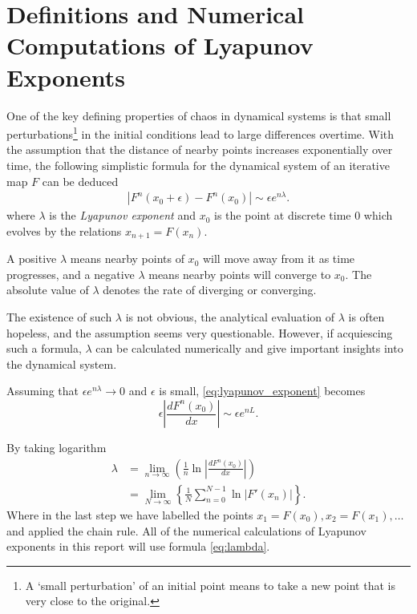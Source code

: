\section{Definitions and Numerical Computations of Lyapunov Exponents}

One of the key defining properties of chaos in dynamical systems is that small perturbations\footnote{A `small perturbation' of an initial point means to take a new point that is very close to the original.} in the initial conditions lead to large differences overtime.
With the assumption that the distance of nearby points increases exponentially over time, the following simplistic formula for the dynamical system of an iterative map $F$ can be deduced
\begin{align}\label{eq:lyapunov_exponent}
    \left|F^n(x_0+\epsilon)-F^n(x_0)\right| \sim \epsilon e^{n \lambda}.
\end{align}
where $\lambda$ is the \emph{Lyapunov exponent} \cite{nonlinear_system} \cite{lyapunov} and $x_0$ is the point at discrete time $0$ which evolves by the relations $x_{n+1} = F(x_n)$.

A positive $\lambda$ means nearby points of $x_0$ will move away from it as time progresses, and a negative $\lambda$ means nearby points will converge to $x_0$. 
The absolute value of $\lambda$ denotes the rate of diverging or converging.

The existence of such $\lambda$ is not obvious, the analytical evaluation of $\lambda$ is often hopeless, and the assumption seems very questionable.
However, if acquiescing such a formula, $\lambda$ can be calculated numerically and give important insights into the dynamical system. 


Assuming that $\epsilon e^{n \lambda} \to 0$ and $\epsilon$ is small, \eqref{eq:lyapunov_exponent} becomes
$$
\epsilon \left| \frac{dF^n(x_0)}{dx} \right| \sim \epsilon e^{nL}.
$$

By taking logarithm
\begin{align}
    \lambda 
    &= \lim_{n \to \infty}\left(\frac{1}{n}\ln{\left|\frac{dF^n(x_0)}{dx}\right|}\right)  \\
    &= \lim_{N \to \infty}\left\{\frac{1}{N}\sum_{n=0}^{N-1}\ln{|F'(x_n)|}\right\}  \label{eq:lambda}.
\end{align}
Where in the last step we have labelled the points $x_1 = F(x_0), x_2 = F(x_1), \dots$ and applied the chain rule.
All of the numerical calculations of Lyapunov exponents in this report will use formula \eqref{eq:lambda}.

